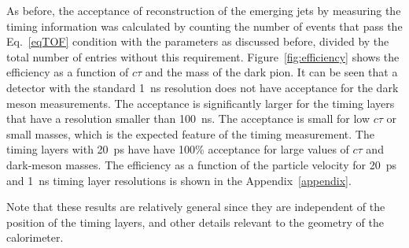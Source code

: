 As before, the acceptance of reconstruction of the emerging jets by measuring the timing information was calculated by 
counting the number of events that pass the 
Eq.~\ref{eqTOF} condition  with the parameters as discussed before, divided by the total number of entries
without this requirement. Figure~\ref{fig:efficiency} shows the efficiency
as a function of $c\tau$ and the mass of the dark pion. It can be seen that a detector with the standard 1~ns resolution does
not have acceptance for the dark meson measurements. The acceptance is significantly larger for the timing layers that have a resolution smaller than 100~ns.
The acceptance is small for low $c\tau$ or small masses, which is the expected feature of the timing measurement.
The timing layers with 20~ps have have 100\% acceptance for large values of $c\tau$ and dark-meson masses.
The efficiency as a function of the particle velocity for 20~ps and 1~ns timing layer resolutions
is shown in the Appendix~\ref{appendix}.

Note that these results are relatively general since they are 
independent of the position of the timing layers, and other details relevant to 
the geometry of the calorimeter.  

